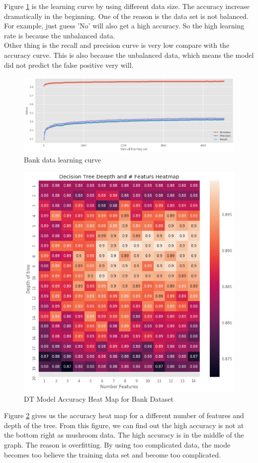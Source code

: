 \documentclass[10pt, conference, compsocconf]{IEEEtran}
\begin{document}
Figure \ref{fig:bank_dt_learning} is the learning curve by using different data size. The accuracy increase dramatically in the beginning. One of the reason is the data set is not balanced. For example, just guess 'No' will also get a high accuracy. So the high learning rate is because the unbalanced data. \\
Other thing is the recall and precision curve is very low compare with the accuracy curve. This is also because the unbalanced data, which means the model did not predict the false positive very will. \\
\begin{figure}[h]
	\centering
	\includegraphics[scale = 0.2]{image/bank_dt_learning.png}
	\caption{Bank data learning curve }
	\label{fig:bank_dt_learning}
\end{figure}

\begin{figure}[h]
	\centering
	\includegraphics[scale = 0.4]{image/bank_dt_heat.png}
	\caption{DT Model Accuracy Heat Map for Bank Dataset  }
	\label{fig:bank_dt_heat}
\end{figure}
Figure \ref{fig:bank_dt_heat} gives us the accuracy heat map for a different number of features and depth of the tree. From this figure, we can find out the high accuracy is not at the bottom right as mushroom data. The high accuracy is in the middle of the graph. The reason is overfitting. By using too complicated data, the mode becomes too believe the training data set and become too complicated. 
\end{document}
